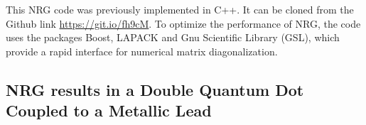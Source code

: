  This NRG code was previously implemented in C++. It can be cloned from the Github link \url{https://git.io/fh9cM}.  To optimize the performance of NRG, the code uses the packages Boost, LAPACK and Gnu Scientific Library (GSL), which provide a rapid interface for numerical matrix diagonalization. 
 









\subsection{NRG results in a Double Quantum Dot Coupled to a Metallic Lead\label{sec: NRG-DQD}}


